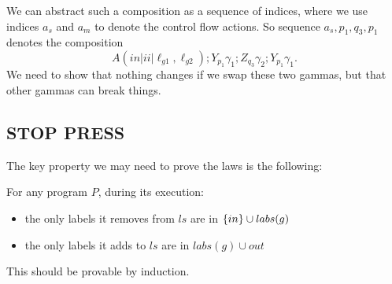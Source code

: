 We can abstract such a composition as a sequence of indices,
where we use indices $a_s$ and $a_m$ to denote the control flow actions.
So sequence $a_s,p_1,q_3,p_1$
denotes the composition
\[
A(in|ii|\ell_{g1},\ell_{g2}) ; Y_{p_1}\gamma_1 ; Z_{q_3}\gamma_2 ; Y_{p_1}\gamma_1.
\]
We need to show that nothing changes if we swap these two gammas,
but that other gammas can break things.

\subsection{STOP PRESS}

The key property we may need to prove the laws is the following:

For any program $P$, during its execution:
\begin{itemize}
  \item the only labels it removes from $ls$ are in $\{in\} \cup labs(g)$
  \item the only labels it adds to $ls$ are in $labs(g) \cup{out}$
\end{itemize}
This should be provable by induction.
